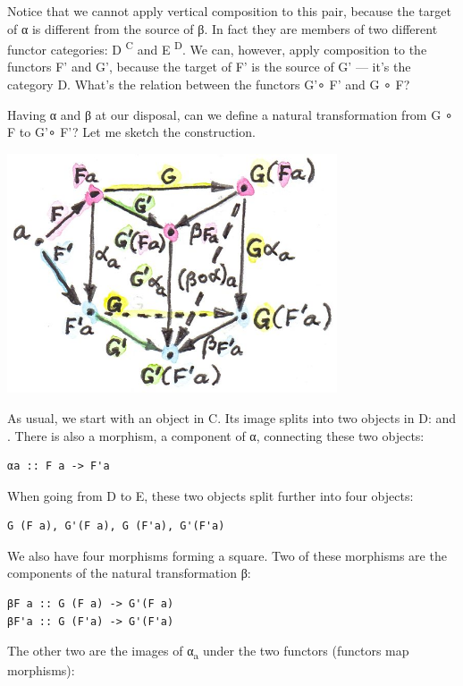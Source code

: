 Notice that we cannot apply vertical composition to this pair, because
the target of α is different from the source of β. In fact they are
members of two different functor categories: D \textsuperscript{C} and E
\textsuperscript{D}. We can, however, apply composition to the functors
F' and G', because the target of F' is the source of G' --- it's the
category D. What's the relation between the functors G'∘ F' and G ∘ F?

Having α and β at our disposal, can we define a natural transformation
from G ∘ F to G'∘ F'? Let me sketch the construction.

\includegraphics[width=3.84375in]{images/9_horizontal.jpg}

As usual, we start with an object  in C. Its image splits into
two objects in D:  and . There is also a
morphism, a component of α, connecting these two objects:

\begin{verbatim}
αa :: F a -> F'a
\end{verbatim}

When going from D to E, these two objects split further into four
objects:

\begin{verbatim}
G (F a), G'(F a), G (F'a), G'(F'a)
\end{verbatim}

We also have four morphisms forming a square. Two of these morphisms are
the components of the natural transformation β:

\begin{verbatim}
βF a :: G (F a) -> G'(F a)
βF'a :: G (F'a) -> G'(F'a)
\end{verbatim}

The other two are the images of α\textsubscript{a} under the two
functors (functors map morphisms):

